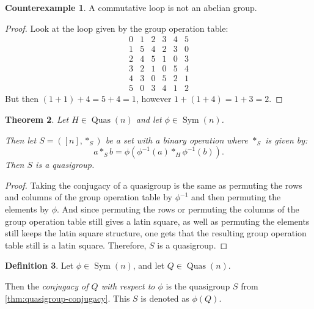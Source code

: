 \documentclass[a4paper, 12pt, english]{article}
\theoremstyle{plain}
\newtheorem{theorem}{Theorem}[section]
\theoremstyle{definition}
\newtheorem{definition}[theorem]{Definition}
\newtheorem{counterexample}[theorem]{Counterexample}
\newcommand{\tuple}[1]{ \left( #1 \right) } %
\DeclareMathOperator{\Sym}{Sym}
\DeclareMathOperator{\Quas}{Quas}
\begin{document}
\begin{counterexample} \label{counterexample:commutative-loop-abelian}
    A commutative loop is not an abelian group.
\end{counterexample}
\begin{proof}
    Look at the loop given by the group operation table:
    \[
        \begin{matrix}
            0 & 1 & 2 & 3 & 4 & 5 \\
            1 & 5 & 4 & 2 & 3 & 0 \\
            2 & 4 & 5 & 1 & 0 & 3 \\
            3 & 2 & 1 & 0 & 5 & 4 \\
            4 & 3 & 0 & 5 & 2 & 1 \\
            5 & 0 & 3 & 4 & 1 & 2
        \end{matrix}
    \]
    But then \( (1 + 1) + 4 = 5 + 4 = 1 \), however \( 1 + (1 + 4) = 1 + 3 = 2 \).
\end{proof}

\begin{theorem} \label{thm:quasigroup-conjugacy}
    Let \( H \in \Quas(n) \) and let \( \phi \in \Sym(n) \).

    Then let \( S = \tuple{[n], *_S} \) be a set with a binary operation where \( *_S \) is given by:
    \[
        a *_S b = \phi(\phi^{-1}(a) *_H \phi^{-1}(b)).
    \]
    Then \( S \) is a quasigroup.
\end{theorem}
\begin{proof}
    Taking the conjugacy of a quasigroup is the same as permuting the rows and columns of the group operation table by \( \phi^{-1} \) and then permuting the elements by \( \phi \). And since permuting the rows or permuting the columns of the group operation table still gives a latin square, as well as permuting the elements still keeps the latin square structure, one gets that the resulting group operation table still is a latin square. Therefore, \( S \) is a quasigroup.
\end{proof}

\begin{definition} \label{def:quasigroup-conjugacy}
    Let \( \phi \in \Sym(n) \), and let \( Q \in \Quas(n) \).

    Then the \emph{conjugacy of \( Q \) with respect to \( \phi \)} is the quasigroup \( S \) from \autoref{thm:quasigroup-conjugacy}. This \( S \) is denoted as \( \phi(Q) \).
\end{definition}
\end{document}

